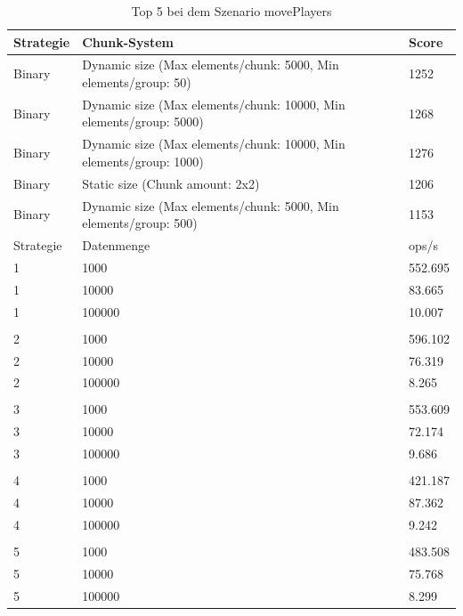 \begin{table}[htp]
    \centering
    \caption{Top 5 bei dem Szenario movePlayers}
    \begin{tabular}{|l|l|l|}
    \hline
        Strategie & Chunk-System & Score \\
        \hline
        Binary & Dynamic size (Max elements/chunk: 5000, Min elements/group: 50) & 1252\\
        Binary & Dynamic size (Max elements/chunk: 10000, Min elements/group: 5000) & 1268\\
        Binary & Dynamic size (Max elements/chunk: 10000, Min elements/group: 1000) & 1276\\
        Binary & Static size (Chunk amount: 2x2) & 1206\\
        Binary & Dynamic size (Max elements/chunk: 5000, Min elements/group: 500) & 1153\\
        \hline
        Strategie & Datenmenge & ops/s \\
        \hline
        1 & 1000 & 552.695\\
        1 & 10000 & 83.665\\
        1 & 100000 & 10.007\\
         & & \\
        2 & 1000 & 596.102\\
        2 & 10000 & 76.319\\
        2 & 100000 & 8.265\\
         & & \\
        3 & 1000 & 553.609\\
        3 & 10000 & 72.174\\
        3 & 100000 & 9.686\\
         & & \\
        4 & 1000 & 421.187\\
        4 & 10000 & 87.362\\
        4 & 100000 & 9.242\\
         & & \\
        5 & 1000 & 483.508\\
        5 & 10000 & 75.768\\
        5 & 100000 & 8.299\\
        \hline
    \end{tabular}
    \label{tbl:movePlayers}
\end{table}

